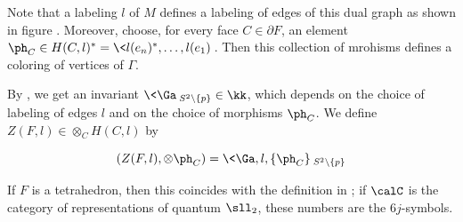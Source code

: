 Note that a labeling $l$ of $M$ defines a labeling of edges of this dual graph as shown in figure . 
Moreover, choose, for every face $C \in \partial F$, an element $\ph_C \in H(C,l)^*=\<l(e_n)^*,\dots,l(e_1)\>$. Then this 
collection of mrohisms defines a coloring of vertices of $\Gamma$.

By , we get an invariant $\<\Ga\>_{S^2\setminus\{p\}} \in \kk$, which depends on the choice of
 labeling of edges $l$ and on the choice of morphisms $\ph_C$. We define $Z(F,l) \in \otimes_C H(C,l)$ by

\begin{equation}
	(Z(F,l),\otimes \ph_C)=\<\Ga,l,\{ \ph_C\}\>_{S^2\setminus\{p\}}
\end{equation}

If $F$ is a tetrahedron, then this coincides with the definition in \cite{barrett}; if $\calC$ is the category of representations 
of quantum $\sll_2$, these numbers are the $6j$-symbols.

